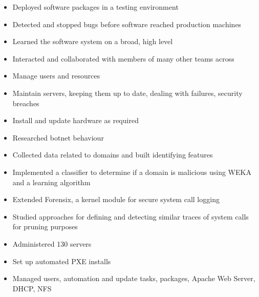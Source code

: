 \documentclass{article}
\begin{document}
      \begin{itemize}
        \item Deployed software packages in a testing environment
        \item Detected and stopped bugs before software reached production machines
        \item Learned the software system on a broad, high level
        \item Interacted and collaborated with members of many other teams across
      \end{itemize}

      \begin{itemize}
        \item Manage users and resources
        \item Maintain servers, keeping them up to date, dealing with failures, security breaches
        \item Install and update hardware as required
      \end{itemize}

      \begin{itemize}
        \item Researched botnet behaviour
        \item Collected data related to domains and built identifying features
        \item Implemented a classifier to determine if a domain is malicious using WEKA and a learning algorithm
      \end{itemize}

      \begin{itemize}
        \item Extended Forensix, a kernel module for secure system call logging
        \item Studied approaches for defining and detecting similar traces of system calls for pruning purposes
      \end{itemize}

      \begin{itemize}
        \item Administered 130 servers
        \item Set up automated PXE installs
        \item Managed users, automation and update tasks, packages, Apache Web Server, DHCP, NFS
      \end{itemize}
\end{document}
